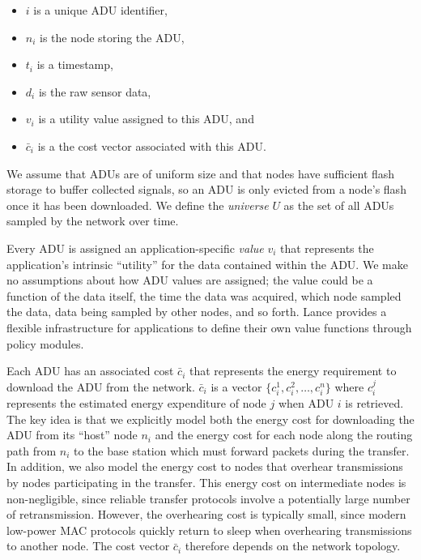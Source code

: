 \begin{itemize}

\item $i$ is a unique ADU identifier,

\item $n_i$ is the node storing the ADU,

\item $t_i$ is a timestamp,

\item $d_i$ is the raw sensor data,

\item $v_i$ is a utility value assigned to this ADU, and

\item $\bar{c}_i$ is a the cost vector associated with this ADU.

\end{itemize}

We assume that ADUs are of uniform size and that nodes have sufficient flash
storage to buffer collected signals, so an ADU is only evicted from a node's
flash once it has been downloaded. We define the \textit{universe} $U$ as the
set of all ADUs sampled by the network over time. 

Every ADU is assigned an application-specific \textit{value} $v_i$ that
represents the application's intrinsic ``utility'' for the data contained
within the ADU. We make no assumptions about how ADU values are assigned; the
value could be a function of the data itself, the time the data was acquired,
which node sampled the data, data being sampled by other nodes, and so forth.
Lance provides a flexible infrastructure for applications to define their own
value functions through policy modules.

Each ADU has an associated cost $\bar{c}_i$ that represents the energy
requirement to download the ADU from the network. $\bar{c}_i$ is a vector $\{
c_i^1, c_i^2, \ldots, c_i^n \}$ where $c_i^j$ represents the estimated energy
expenditure of node $j$ when ADU $i$ is retrieved. The key idea is that we
explicitly model both the energy cost for downloading the ADU from its
``host'' node $n_i$ and the energy cost for each node along the routing path
from $n_i$ to the base station which must forward packets during the
transfer. In addition, we also model the energy cost to nodes that overhear
transmissions by nodes participating in the transfer. This energy cost on
intermediate nodes is non-negligible, since reliable transfer protocols
involve a potentially large number of retransmission. However, the
overhearing cost is typically small, since modern low-power MAC protocols
quickly return to sleep when overhearing transmissions to another node. The
cost vector $\bar{c}_i$ therefore depends on the network topology.

